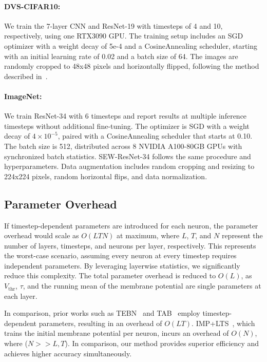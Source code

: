\paragraph{DVS-CIFAR10:} We train the 7-layer CNN and ResNet-19 with timesteps of 4 and 10, respectively, using one RTX3090 GPU. The training setup includes an SGD optimizer with a weight decay of 5e-4 and a CosineAnnealing scheduler, starting with an initial learning rate of 0.02 and a batch size of 64. The images are randomly cropped to 48x48 pixels and horizontally flipped, following the method described in~\cite{tebn:2022, tab:2024}.

\paragraph{ImageNet:} We train ResNet-34 with 6 timesteps and report results at multiple inference timesteps without additional fine-tuning. The optimizer is SGD with a weight decay of \(4\times10^{-5}\), paired with a CosineAnnealing scheduler that starts at 0.10. The batch size is 512, distributed across 8 NVIDIA A100-80GB GPUs with synchronized batch statistics. SEW-ResNet-34 follows the same procedure and hyperparameters.  Data augmentation includes random cropping and resizing to 224x224 pixels, random horizontal flips, and data normalization.

\subsection{Parameter Overhead}

If timestep-dependent parameters are introduced for each neuron, the parameter overhead would scale as \(O(L T N)\) at maximum, where \(L\), \(T\), and \(N\) represent the number of layers, timesteps, and neurons per layer, respectively. This represents the worst-case scenario, assuming every neuron at every timestep requires independent parameters. By leveraging layerwise statistics, we significantly reduce this complexity. The total parameter overhead is reduced to \(O(L)\), as \(V_{\text{thr}}\), \(\tau\), and the running mean of the membrane potential are single parameters at each layer.

In comparison, prior works such as TEBN~\cite{tebn:2022} and TAB~\cite{tab:2024} employ timestep-dependent parameters, resulting in an overhead of \(O(LT)\). IMP+LTS~\cite{shen:2024}, which trains the initial membrane potential per neuron, incurs an overhead of $O(N)$, where ($N>>L,T$). In comparison, our method provides superior efficiency and achieves higher accuracy simultaneously.

